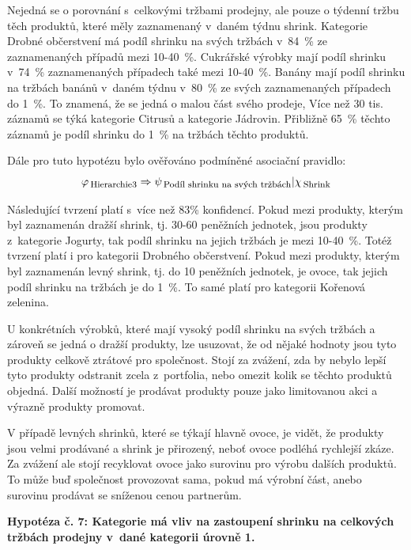 Nejedná se o porovnání s~celkovými tržbami prodejny, ale pouze o týdenní tržbu těch produktů, které měly zaznamenaný v~daném týdnu shrink.
Kategorie Drobné občerstvení má podíl shrinku na svých tržbách v~84~\% ze zaznamenaných případů mezi 10-40~\%.
Cukrářské výrobky  mají podíl shrinku v~74~\% zaznamenaných případech také mezi 10-40~\%.
Banány mají podíl shrinku na tržbách banánů v~daném týdnu v~80~\% ze svých zaznamenaných případech do 1~\%. To znamená, že se jedná o malou část svého prodeje,
Více než 30 tis. záznamů se týká kategorie Citrusů a kategorie Jádrovin. Přibližně 65~\% těchto záznamů je podíl shrinku do 1~\% na tržbách těchto produktů.

Dále pro tuto hypotézu bylo ověřováno podmíněné asociační pravidlo:
\begin{equation}
    \varphi_{\mbox{\,\footnotesize Hierarchie3}} \Rightarrow \psi_{\mbox{\,\footnotesize Podíl shrinku na svých tržbách}} | \chi_{\mbox{\,\footnotesize Shrink}}
\end{equation} 

Následující tvrzení platí s~více než 83\% konfidencí.
Pokud mezi produkty, kterým byl zaznamenán dražší shrink, tj. 30-60 peněžních jednotek, jsou produkty z~kategorie Jogurty, tak podíl shrinku na jejich tržbách je mezi 10-40~\%. Totéž tvrzení platí i pro kategorii Drobného občerstvení.
Pokud mezi produkty, kterým byl zaznamenán levný shrink, tj. do 10 peněžních jednotek, je ovoce, tak jejich podíl shrinku na tržbách je do 1~\%. To samé platí pro kategorii Kořenová zelenina.

U konkrétních výrobků, které mají vysoký podíl shrinku na svých tržbách a zároveň se jedná o dražší produkty, lze usuzovat, že od nějaké hodnoty jsou tyto produkty celkově ztrátové pro společnost. Stojí za zvážení, zda by nebylo lepší tyto produkty odstranit zcela z~portfolia, nebo omezit kolik se těchto produktů objedná. Další možností je prodávat produkty pouze jako limitovanou akci a výrazně produkty promovat.

V případě levných shrinků, které se týkají hlavně ovoce, je vidět, že produkty jsou velmi prodávané a shrink je přirozený, neboť ovoce podléhá rychlejší zkáze. Za zvážení ale stojí recyklovat ovoce jako surovinu pro výrobu dalších produktů. To může buď společnost provozovat sama, pokud má výrobní část, anebo surovinu prodávat se sníženou cenou partnerům.

\vspace*{1em}

\textbf{Hypotéza č. 7: Kategorie má vliv na zastoupení shrinku na celkových tržbách prodejny v~dané kategorii úrovně 1.}

